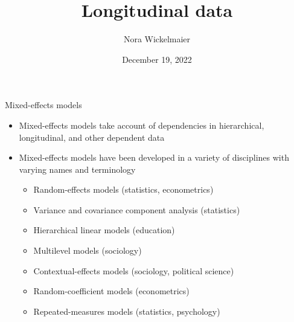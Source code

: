 \documentclass[aspectratio=169]{beamer}
\title{Longitudinal data}
\author{Nora Wickelmaier}
\date{December 19, 2022}
\begin{document}
\begin{frame}{}
\thispagestyle{empty}
\titlepage
\end{frame}



\begin{frame}{Mixed-effects models}
\begin{itemize}
  \item Mixed-effects models take account of dependencies in hierarchical,
    longitudinal, and other dependent data
  \item Mixed-effects models have been developed in a variety of
    disciplines with varying names and terminology
  \begin{itemize}
    \item Random-effects models (statistics, econometrics)
    \item Variance and covariance component analysis (statistics)
    \item Hierarchical linear models (education)
    \item Multilevel models (sociology)
    \item Contextual-effects models (sociology, political science)
    \item Random-coefficient models (econometrics)
    \item Repeated-measures models (statistics, psychology)
  \end{itemize}
\end{itemize}
  \begin{flushright}{\footnotesize \citet{Fox2016}}\end{flushright}
\end{frame}


% 
% 
\end{document}
